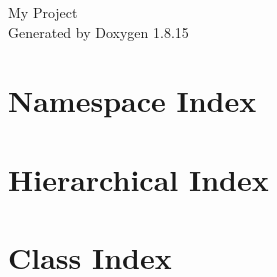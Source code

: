 \let\mypdfximage\pdfximage\def\pdfximage{\immediate\mypdfximage}\documentclass[twoside]{book}
\newcommand{\+}{\discretionary{\mbox{\scriptsize$\hookleftarrow$}}{}{}}
\newcommand{\clearemptydoublepage}{%
  \newpage{\pagestyle{empty}\cleardoublepage}%
}
\begin{document}
\hypersetup{pageanchor=false,
             bookmarksnumbered=true,
             pdfencoding=unicode
            }
\begin{titlepage}
\vspace*{7cm}
\begin{center}%
{\Large My Project }\\
\vspace*{1cm}
{\large Generated by Doxygen 1.8.15}\\
\end{center}
\end{titlepage}
\clearemptydoublepage
{}
\tableofcontents
\clearemptydoublepage
{}
\hypersetup{pageanchor=true}

\chapter{Namespace Index}

\chapter{Hierarchical Index}

\chapter{Class Index}

\end{document}
